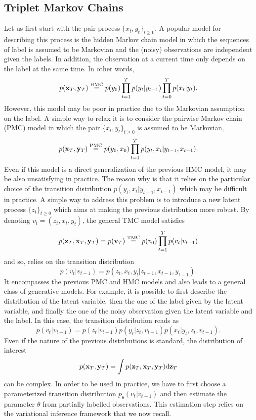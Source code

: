 \documentclass{article}
\def\x{{\mathbf x}}
\def\z{{\mathbf z}}
\def\y{{\mathbf y}}
\def\v{{\mathbf v}}
\def\p{p_{\theta}}
\begin{document}
\subsection{Triplet Markov Chains}
Let us first start with the pair process $\{x_t,y_t\}_{t \geq 0}$. 
A popular model for describing this process is the hidden Markov chain model in which the sequences of label is assumed to be Markovian and the (noisy) observations are independent given the labels. In addition, the observation at a current time only depends 
on the label at the same time. In other words,
$$p(\x_T,\y_T)\overset{\rm HMC}{=}p(y_0)\prod_{t=1}^Tp(y_t|y_{t-1}) \prod_{t=0}^Tp(x_t|y_{t}) \text{.} $$
However, this model may be poor in practice due
to the Markovian assumption on the label. A simple way 
to relax it is to consider the pairwise Markov chain (PMC) model in which the pair
$\{x_t,y_t\}_{t \geq 0}$ is assumed to be Markovian,
$$p(\x_T,\y_T)\overset{\rm PMC}{=}p(y_0,x_0)\prod_{t=1}^Tp(y_t,x_t|y_{t-1},x_{t-1}) \text{.} $$
Even if this model is a direct generalization of the previous HMC model, it may be also unsatisfying in practice. The reason why is that it relies on the particular choice of the transition distribution $p(y_t,x_t|y_{t-1},x_{t-1})$ which may be difficult in practice. 
A simple way to address this problem is
to introduce a new latent process $\{z_t\}_{t \geq 0}$ which aims at making the previous distribution more robust. By denoting 
$ v_t=(z_t,x_t,y_t) \text{,}$ the general TMC model satisfies 
\begin{equation}
\label{eq:tmc}
p(\z_T,\x_T,\y_T)=p(\v_T)\overset{\rm TMC}{=}p(v_0)\prod_{t=1}^Tp(v_t|v_{t-1}) 
\end{equation}
and so, relies on the transition
distribution 
$$p(v_t|v_{t-1})=p(z_t,x_t,y_t|z_{t-1},x_{t-1},y_{t-1}) \text{.}$$
It encompasses the previous PMC and HMC models and also leads to a general class of generative models. 
For example, it is possible to first describe the distribution of the latent variable, then the one of the label given by the latent variable, and finally the one of the noisy observation given the latent variable and the label. In this case, the transition distribution reads as
$$p(v_t|v_{t-1})=p(z_t|v_{t-1})p(y_t|z_t,v_{t-1}) p(x_t|y_t,z_t,v_{t-1}) \text{.}$$
Even if the nature of the previous distributions is standard, the distribution
of interest
$$p(\x_T,\y_T)=\int p(\z_T,\x_T,\y_T) {\rm d}\z_T $$
can be complex.
In order to be used in practice,
we have to first choose a parameterized
transition distribution $\p(v_t|v_{t-1})$
and then estimate the parameter $\theta$ from partially labelled observations. 
This estimation step relies on the variational inference framework that we now recall.
\end{document}
